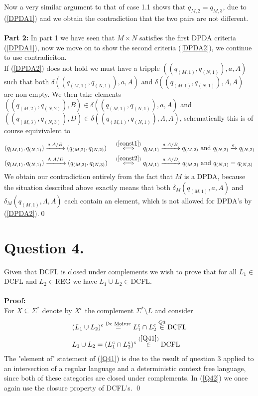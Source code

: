 \documentclass{article}
\theoremstyle{remark}
\numberwithin{equation}{section}
\begin{document}
Now a very similar argument to that of case 1.1 shows that $q_{M,2}=q_{M,3}$, due to (\ref{DPDA1}) and we obtain the contradiction that the two pairs are not different.\\
\\\textbf{Part 2:} In part 1 we have seen that $M\times N$ satisfies the first DPDA criteria (\ref{DPDA1}), now we move on to show the second criteria (\ref{DPDA2}), we continue to use contradiciton.
\\If (\ref{DPDA2}) does not hold we must have a tripple $((q_{(M,1)},q_{(N,1)}),a,A)$ such that both $\delta((q_{(M,1)},q_{(N,1)}),a,A)$ and $\delta((q_{(M,1)},q_{(N,1)}),\Lambda,A)$ are non empty. We then take elements $((q_{(M,2)},q_{(N,2)}),B)\in\delta((q_{(M,1)},q_{(N,1)}),a,A)$ and $((q_{(M,3)},q_{(N,3)}),D)\in\delta((q_{(M,1)},q_{(N,1)}),\Lambda,A)$, schematically this is of course equivivalent to
\begin{align*}
	&(q_{(M,1)},q_{(N,1)}) \xrightarrow{a\text{ }A/B}(q_{(M,2)},q_{(N,2)}) &&\stackrel{(\ref{const1})}{\iff} q_{(M,1)}\xrightarrow{a\text{ }A/B}q_{(M,2)}\text{ and }q_{(N,2)}\xrightarrow{a}q_{(N,2)}\\
	&(q_{(M,1)},q_{(N,1)}) \xrightarrow{\Lambda\text{ }A/D}(q_{(M,3)},q_{(N,3)}) &&\stackrel{(\ref{const2})}{\iff} q_{(M,1)}\xrightarrow{a\text{ }A/D}q_{(M,3)}\text{ and }q_{(N,1)}=q_{(N,3)}
\end{align*}
We obtain our contradiction entirely from the fact that $M$ is a DPDA, because the situation described above exactly means that both $\delta_M(q_{(M,1)},a,A)$ and $\delta_M(q_{(M,1)},\Lambda,A)$ each contain an element, which is not allowed for DPDA's by (\ref{DPDA2}).\qed
\section*{Question 4.}
Given that DCFL is closed under complements we wish to prove that for all $L_1\in$DCFL and $L_2\in$REG we have $L_1\cup L_2\in$DCFL.\\
\\\textbf{Proof:}\\
For $X\subseteq\Sigma^*$ denote by $X^c$ the complement $\Sigma^*\setminus L$ and consider
\begin{align}
	&(L_1\cup L_2)^c \stackrel{\text{De Moivre}}{=} L_1^c\cap L_2^c \stackrel{Q3}{\in} \text{DCFL} \label{Q41}\\
	&L_1 \cup L_2 = (L_1^c\cap L_2^c)^c \stackrel{(\ref{Q41})}{\in} \text{DCFL} \label{Q42}
\end{align}
The "element of"\text{ } statement of (\ref{Q41}) is due to the result of question 3 applied to an intersection of a regular language and a deterministic context free language, since both of these categories are closed under complements. In (\ref{Q42}) we once again use the closure property of DCFL's. \qed
\end{document}
